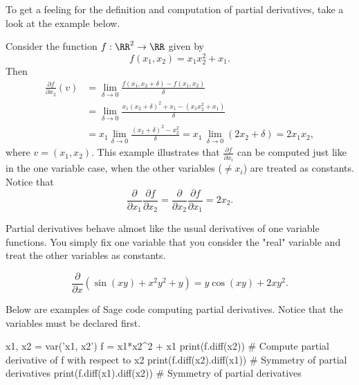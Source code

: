 \documentclass{article}
\begin{document}
To get a feeling for the definition and computation of partial derivatives, take a look at the
example below.

\begin{example}\label{Examplepartdif}
  Consider the function $f: \RR^2 \rightarrow \RR$ given by
  \begin{equation*}
    f(x_1, x_2) = x_1 x_2^2 + x_1.
  \end{equation*}
  Then
  \begin{align*}
    \frac{\partial f}{\partial x_2}(v) &=
    \lim_{\delta\to 0}\frac{f(x_1, x_2 + \delta) - f(x_1, x_2)}{\delta}\\
    & = \lim_{\delta\to 0}
    \frac{x_1 (x_2+\delta)^2 + x_1 - (x_1 x_2^2 + x_1)}{\delta}\\
    &= x_1 \lim_{\delta\to 0}\frac{(x_2+\delta)^2 - x_2^2}{\delta} =
    x_1\, \lim_{\delta\to 0} (2 x_2 + \delta) = 2 x_1 x_2,
  \end{align*}
  where $v = (x_1, x_2)$. This example illustrates that
  $\frac{\partial f}{\partial x_i}$ can be computed just like in the
  one variable case, when the other variables ($\neq x_i$) are treated
  as constants. Notice that
  \begin{equation*}
    \frac{\partial}{\partial x_1}\frac{\partial f}{\partial x_2} =
    \frac{\partial }{\partial x_2}\frac{\partial f}{ \partial x_1} = 2
    x_2. 
  \end{equation*}

  
\end{example}

Partial derivatives behave almost like the usual derivatives of one
variable functions. You simply fix one variable that you
consider the "real" variable and treat the other variables as constants.

\begin{example}\label{exsagepd}
  $$
  \frac{\partial}{\partial x}\left( \sin(x y) + x^2 y^2 + y\right) = y \cos(x y) + 2 x y^2.
  $$
\end{example}

Below are examples of Sage code computing partial derivatives. Notice that the
variables must be declared first.

\begin{sage}
x1, x2 = var('x1, x2')
f = x1*x2^2 + x1
print(f.diff(x2)) # Compute partial derivative of f with respect to x2
print(f.diff(x2).diff(x1)) # Symmetry of partial derivatives
print(f.diff(x1).diff(x2)) # Symmetry of partial derivatives
\end{sage}
\end{document}
